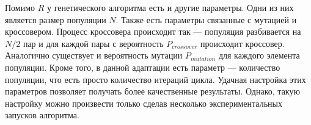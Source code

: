 \begin{spacing}{1.3}
Помимо $R$  у генетического алгоритма есть и другие параметры. Одни из них является размер популяции $N$. Также есть параметры связанные с мутацией и кроссовером. Процесс кроссовера происходит так --- популяция разбивается на $N/2$ пар и для каждой пары с вероятность $P_{crossover}$ происходит кроссовер. Аналогично существует и вероятность мутации $P_{mutation}$ для каждого элемента популяции. Кроме того, в данной адаптации есть параметр --- количество популяции, что есть просто количество итераций цикла. Удачная настройка этих параметров позволяет получать более качественные результаты. Однако, такую настройку можно произвести только сделав несколько  экспериментальных запусков алгоритма.




\end{spacing}